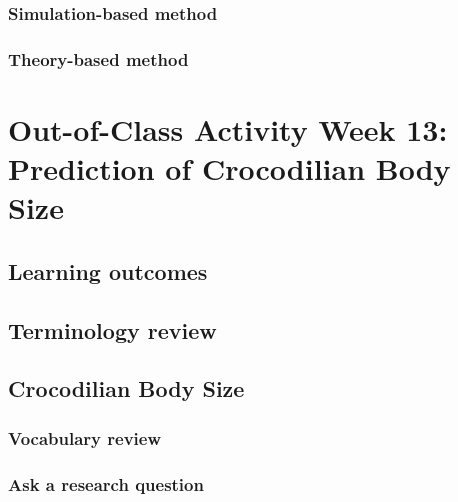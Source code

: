 \documentclass[
]{report}
\begin{document}
\hypertarget{simulation-based-method-9}{%
\subsubsection*{Simulation-based method}\label{simulation-based-method-9}}

\hypertarget{theory-based-method-6}{%
\subsubsection*{Theory-based method}\label{theory-based-method-6}}

\hypertarget{out-of-class-activity-week-13-prediction-of-crocodilian-body-size}{%
\section{Out-of-Class Activity Week 13: Prediction of Crocodilian Body Size}\label{out-of-class-activity-week-13-prediction-of-crocodilian-body-size}}

\hypertarget{learning-outcomes-25}{%
\subsection{Learning outcomes}\label{learning-outcomes-25}}

\hypertarget{terminology-review-21}{%
\subsection{Terminology review}\label{terminology-review-21}}

\hypertarget{crocodilian-body-size}{%
\subsection{Crocodilian Body Size}\label{crocodilian-body-size}}

\hypertarget{vocabulary-review-2}{%
\subsubsection*{Vocabulary review}\label{vocabulary-review-2}}

\hypertarget{ask-a-research-question-5}{%
\subsubsection*{Ask a research question}\label{ask-a-research-question-5}}
\end{document}

